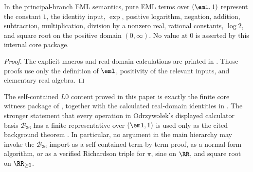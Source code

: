 \begin{proposition}
\label{prop:internal-core-eml-witnesses}
In the principal-branch EML semantics, pure EML terms over \((\eml,1)\) represent
the constant \(1\), the identity input, \(\exp\), positive logarithm, negation,
addition, subtraction, multiplication, division by a nonzero real, rational
constants, \(\log2\), and square root on the positive domain \((0,\infty)\).
No value at \(0\) is asserted by this internal core package.
\end{proposition}

\begin{proof}
The explicit macros and real-domain calculations are printed in
.  Those proofs use only
the definition of \(\eml\), positivity of the relevant inputs, and elementary
real algebra.
\end{proof}

\begin{theorem}
\label{thm:self-contained-L0-core-cited-B36-boundary}
The self-contained \(L0\) content proved in this paper is exactly the finite core
witness package of , together with the
calculated real-domain identities in
.  The stronger statement
that every operation in Odrzywo{\l}ek's displayed calculator basis
\(\mathcal B_{36}\) has a finite representative over \((\eml,1)\) is used only as
the cited background theorem .  In particular, no
argument in the main hierarchy may invoke the \(\mathcal B_{36}\) import as a
self-contained term-by-term proof, as a normal-form algorithm, or as a verified
Richardson triple for \(\pi\), sine on \(\RR\), and square root on
\(\RR_{\ge0}\).
\end{theorem}

